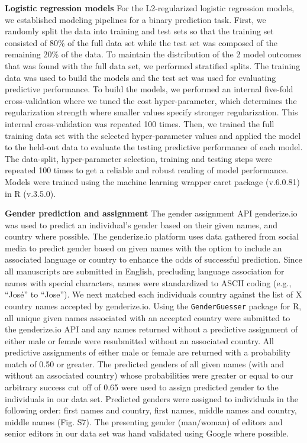 \documentclass[11pt,]{article}
\begin{document}
\textbf{Logistic regression models} For the L2-regularized logistic
regression models, we established modeling pipelines for a binary
prediction task. First, we randomly split the data into training and
test sets so that the training set consisted of 80\% of the full data
set while the test set was composed of the remaining 20\% of the data.
To maintain the distribution of the 2 model outcomes that was found with
the full data set, we performed stratified splits. The training data was
used to build the models and the test set was used for evaluating
predictive performance. To build the models, we performed an internal
five-fold cross-validation where we tuned the cost hyper-parameter,
which determines the regularization strength where smaller values
specify stronger regularization. This internal cross-validation was
repeated 100 times. Then, we trained the full training data set with the
selected hyper-parameter values and applied the model to the held-out
data to evaluate the testing predictive performance of each model. The
data-split, hyper-parameter selection, training and testing steps were
repeated 100 times to get a reliable and robust reading of model
performance. Models were trained using the machine learning wrapper
caret package (v.6.0.81) in R (v.3.5.0).

\textbf{Gender prediction and assignment} The gender assignment API
genderize.io was used to predict an individual's gender based on their
given names, and country where possible. The genderize.io platform uses
data gathered from social media to predict gender based on given names
with the option to include an associated language or country to enhance
the odds of successful prediction. Since all manuscripts are submitted
in English, precluding language association for names with special
characters, names were standardized to ASCII coding (e.g., ``José'' to
``Jose''). We next matched each individuals country against the list of
X country names accepted by genderize.io. Using the
\texttt{GenderGuesser} package for R, all unique given names associated
with an accepted country were submitted to the genderize.io API and any
names returned without a predictive assignment of either male or female
were resubmitted without an associated country. All predictive
assignments of either male or female are returned with a probability
match of 0.50 or greater. The predicted genders of all given names (with
and without an associated country) whose probabilities were greater or
equal to our arbitrary success cut off of 0.65 were used to assign
predicted gender to the individuals in our data set. Predicted genders
were assigned to individuals in the following order: first names and
country, first names, middle names and country, middle names (Fig. S7).
The presenting gender (man/woman) of editors and senior editors in our
data set was hand validated using Google where possible.
\end{document}

